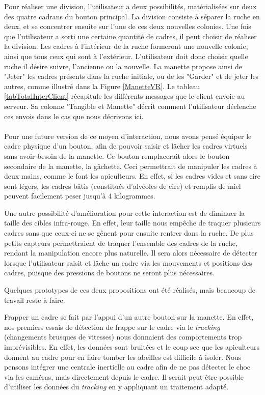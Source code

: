 		Pour réaliser une division, l'utilisateur a deux possibilités, matérialisées sur deux des quatre cadrans du bouton principal. La division consiste à séparer la ruche en deux, et se concentrer ensuite sur l'une de ces deux nouvelles colonies. Une fois que l'utilisateur a sorti une certaine quantité de cadres, il peut choisir de réaliser la division. Les cadres à l'intérieur de la ruche formeront une nouvelle colonie, ainsi que tous ceux qui sont à l'extérieur. L'utilisateur doit donc choisir quelle ruche il désire suivre, l'ancienne ou la nouvelle. La manette propose ainsi de "Jeter" les cadres présents dans la ruche initiale, ou de les "Garder" et de jeter les autres, comme illustré dans la Figure \ref{ManetteVR}. Le tableau \ref{tabTotalInterClient} récapitule les différents messages que le client envoie au serveur. Sa colonne "Tangible et Manette" décrit comment l'utilisateur déclenche ces envois dans le cas que nous décrivons ici.

		\paragraph{}		
		Pour une future version de ce moyen d'interaction, nous avons pensé équiper le cadre physique d'un bouton, afin de pouvoir saisir et lâcher les cadres virtuels sans avoir besoin de la manette. Ce bouton remplacerait alors le bouton secondaire de la manette, la gâchette. Ceci permettrait de manipuler les cadres à deux mains, comme le font les apiculteurs. En effet, si les cadres vides et sans cire sont légers, les cadres bâtis (constitués d'alvéoles de cire) et remplis de miel peuvent facilement peser jusqu'à 4 kilogrammes.
		
		Une autre possibilité d'amélioration pour cette interaction est de diminuer la taille des cibles infra-rouge. En effet, leur taille nous empêche de traquer plusieurs cadres sans que ceux-ci ne se gênent pour ensuite rentrer dans la ruche. De plus petits capteurs permettraient de traquer l'ensemble des cadres de la ruche, rendant la manipulation encore plus naturelle. Il sera alors nécessaire de détecter lorsque l'utilisateur saisit et lâche un cadre via les mouvements et positions des cadres, puisque des pressions de boutons ne seront plus nécessaires.
		
		Quelques prototypes de ces deux propositions ont été réalisés, mais beaucoup de travail reste à faire.
		
		Frapper un cadre se fait par l'appui d'un autre bouton sur la manette. En effet, nos premiers essais de détection de frappe sur le cadre via le \textit{tracking} (changements brusques de vitesses) nous donnaient des comportements trop imprévisibles. En effet, les données sont bruitées et le coup sec que les apiculteurs donnent au cadre pour en faire tomber les abeilles est difficile à isoler. Nous pensons intégrer une centrale inertielle au cadre afin de ne pas détecter le choc via les caméras, mais directement depuis le cadre. Il serait peut être possible d'utiliser les données du \textit{tracking} en y appliquant un traitement adapté.
		

